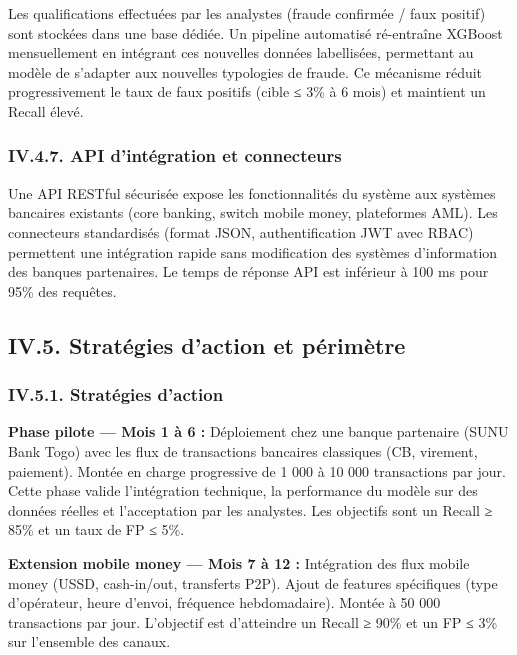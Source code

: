 \documentclass[
  12pt,
]{article}
\begin{document}
Les qualifications effectuées par les analystes (fraude confirmée / faux
positif) sont stockées dans une base dédiée. Un pipeline automatisé
ré-entraîne XGBoost mensuellement en intégrant ces nouvelles données
labellisées, permettant au modèle de s’adapter aux nouvelles typologies
de fraude. Ce mécanisme réduit progressivement le taux de faux positifs
(cible ≤ 3\% à 6 mois) et maintient un Recall élevé.

\subsubsection{IV.4.7. API d’intégration et
connecteurs}\label{iv.4.7.-api-dintuxe9gration-et-connecteurs}

Une API RESTful sécurisée expose les fonctionnalités du système aux
systèmes bancaires existants (core banking, switch mobile money,
plateformes AML). Les connecteurs standardisés (format JSON,
authentification JWT avec RBAC) permettent une intégration rapide sans
modification des systèmes d’information des banques partenaires. Le
temps de réponse API est inférieur à 100 ms pour 95\% des requêtes.

\subsection{IV.5. Stratégies d’action et
périmètre}\label{iv.5.-stratuxe9gies-daction-et-puxe9rimuxe8tre}

\subsubsection{IV.5.1. Stratégies
d’action}\label{iv.5.1.-stratuxe9gies-daction}

\textbf{Phase pilote — Mois 1 à 6 :} Déploiement chez une banque
partenaire (SUNU Bank Togo) avec les flux de transactions bancaires
classiques (CB, virement, paiement). Montée en charge progressive de 1
000 à 10 000 transactions par jour. Cette phase valide l’intégration
technique, la performance du modèle sur des données réelles et
l’acceptation par les analystes. Les objectifs sont un Recall ≥ 85\% et
un taux de FP ≤ 5\%.

\textbf{Extension mobile money — Mois 7 à 12 :} Intégration des flux
mobile money (USSD, cash-in/out, transferts P2P). Ajout de features
spécifiques (type d’opérateur, heure d’envoi, fréquence hebdomadaire).
Montée à 50 000 transactions par jour. L’objectif est d’atteindre un
Recall ≥ 90\% et un FP ≤ 3\% sur l’ensemble des canaux.
\end{document}
